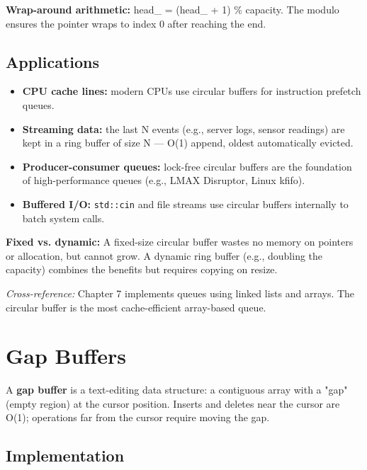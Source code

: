 \textbf{Wrap-around arithmetic:} head\_ = (head\_ + 1) \% capacity. The modulo ensures the pointer wraps to index 0 after reaching the end.

\subsection{Applications}

\begin{itemize}
\item \textbf{CPU cache lines:} modern CPUs use circular buffers for instruction prefetch queues.
\item \textbf{Streaming data:} the last N events (e.g., server logs, sensor readings) are kept in a ring buffer of size N — O(1) append, oldest automatically evicted.
\item \textbf{Producer-consumer queues:} lock-free circular buffers are the foundation of high-performance queues (e.g., LMAX Disruptor, Linux kfifo).
\item \textbf{Buffered I/O:} \texttt{std::cin} and file streams use circular buffers internally to batch system calls.
\end{itemize}

\textbf{Fixed vs. dynamic:} A fixed-size circular buffer wastes no memory on pointers or allocation, but cannot grow. A dynamic ring buffer (e.g., doubling the capacity) combines the benefits but requires copying on resize.

\textit{Cross-reference:} Chapter 7 implements queues using linked lists and arrays. The circular buffer is the most cache-efficient array-based queue.

\section{Gap Buffers}

A \textbf{gap buffer} is a text-editing data structure: a contiguous array with a "gap" (empty region) at the cursor position. Inserts and deletes near the cursor are O(1); operations far from the cursor require moving the gap.

\subsection{Implementation}

